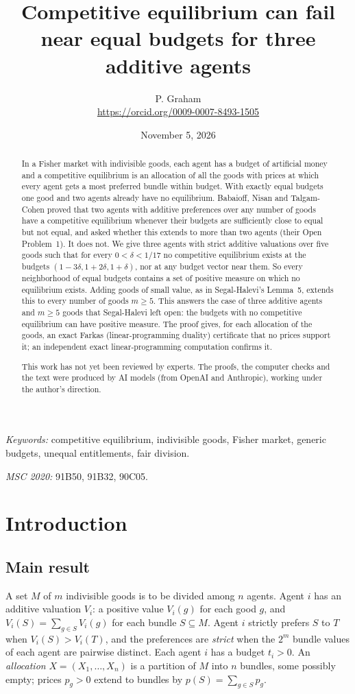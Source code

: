 \documentclass[11pt]{article}
\title{Competitive equilibrium can fail near equal budgets for three additive agents}
\author{P. Graham\\ \small\url{https://orcid.org/0009-0007-8493-1505}}
\date{November 5, 2026}
\theoremstyle{definition}
\theoremstyle{remark}
\begin{document}
\maketitle
\begin{abstract}
In a Fisher market with indivisible goods, each agent has a budget of
artificial money and a competitive equilibrium is an allocation of all the
goods with prices at which every agent gets a most preferred bundle within
budget. With exactly equal budgets one good and two agents already have no
equilibrium. Babaioff, Nisan and Talgam-Cohen proved that two agents with
additive preferences over any number of goods have a competitive
equilibrium whenever their budgets are sufficiently close to equal but not
equal, and asked whether this extends to more than two agents (their Open
Problem~1). It does not. We give three agents with strict additive
valuations over five goods such that for every $0<\delta<1/17$ no
competitive equilibrium exists at the budgets $(1-3\delta,1+2\delta,1+\delta)$,
nor at any budget vector near them. So every neighborhood of equal budgets
contains a set of positive measure on which no equilibrium exists. Adding
goods of small value, as in Segal-Halevi's Lemma~5, extends this to every
number of goods $m\ge5$. This answers the case of three additive agents and
$m\ge5$ goods that Segal-Halevi left open: the budgets with no competitive
equilibrium can have positive measure. The proof gives, for each allocation
of the goods, an exact Farkas (linear-programming duality) certificate that
no prices support it; an independent exact linear-programming computation
confirms it.

This work has not yet been reviewed by experts.
The proofs, the computer checks and the text were produced by AI models
(from OpenAI and Anthropic), working under the author's direction.
\end{abstract}
\medskip
\noindent\textit{Keywords:} competitive equilibrium, indivisible goods,
Fisher market, generic budgets, unequal entitlements, fair division.

\noindent\textit{MSC 2020:} 91B50, 91B32, 90C05.

\section{Introduction}

\subsection{Main result}
A set $M$ of $m$ indivisible goods is to be divided among $n$ agents. Agent
$i$ has an additive valuation $V_i$: a positive value $V_i(g)$ for each good
$g$, and $V_i(S)=\sum_{g\in S}V_i(g)$ for each bundle $S\subseteq M$. Agent
$i$ strictly prefers $S$ to $T$ when $V_i(S)>V_i(T)$, and the preferences are
\emph{strict} when the $2^m$ bundle values of each agent are pairwise
distinct. Each agent $i$ has a budget $t_i>0$. An \emph{allocation}
$X=(X_1,\dots,X_n)$ is a partition of $M$ into $n$ bundles, some possibly
empty; prices $p_g>0$ extend to bundles by $p(S)=\sum_{g\in S}p_g$.
\end{document}
